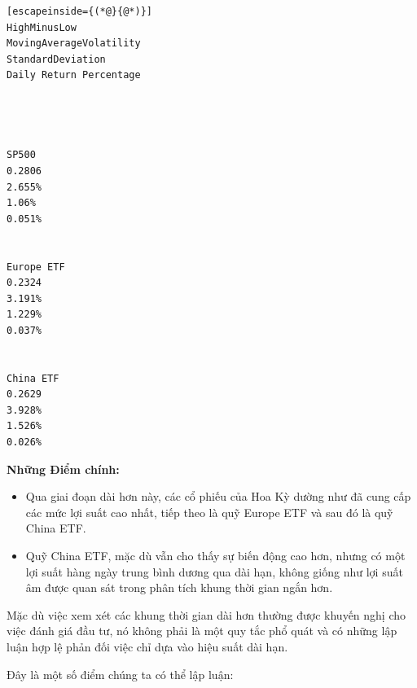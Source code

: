 \begin{lstlisting}[escapeinside={(*@}{@*)}]
HighMinusLow
MovingAverageVolatility
StandardDeviation
Daily Return Percentage




SP500
0.2806
2.655%
1.06%
0.051%


Europe ETF
0.2324
3.191%
1.229%
0.037%


China ETF
0.2629
3.928%
1.526%
0.026%
\end{lstlisting}

\textbf{Những Điểm chính:}

\begin{itemize}
  \item Qua giai đoạn dài hơn này, các cổ phiếu của Hoa Kỳ dường như đã cung cấp các mức lợi suất cao nhất, tiếp theo là quỹ Europe ETF và sau đó là quỹ China ETF.
  \item Quỹ China ETF, mặc dù vẫn cho thấy sự biến động cao hơn, nhưng có một lợi suất hàng ngày trung bình dương qua dài hạn, không giống như lợi suất âm được quan sát trong phân tích khung thời gian ngắn hơn.
\end{itemize}
Mặc dù việc xem xét các khung thời gian dài hơn thường được khuyến nghị cho việc đánh giá đầu tư, nó không phải là một quy tắc phổ quát và có những lập luận hợp lệ phản đối việc chỉ dựa vào hiệu suất dài hạn.

Đây là một số điểm chúng ta có thể lập luận:

